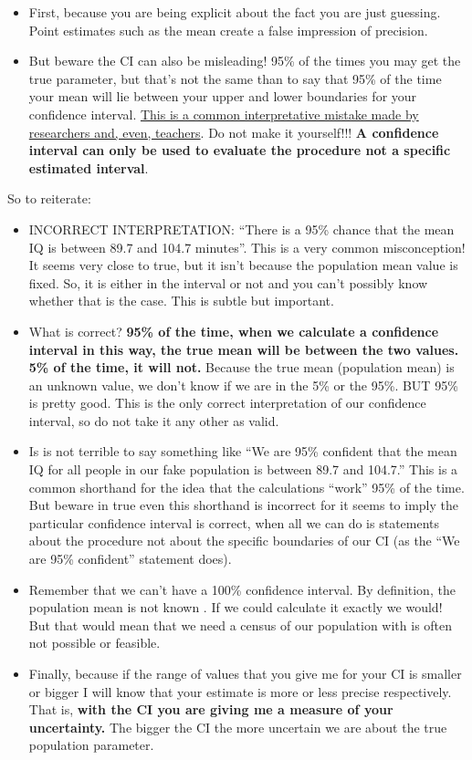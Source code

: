 \documentclass[
]{book}
\providecommand{\tightlist}{%
  \setlength{\itemsep}{0pt}\setlength{\parskip}{0pt}}
\begin{document}
\begin{itemize}
\tightlist
\item
  First, because you are being explicit about the fact you are just guessing. Point estimates such as the mean create a false impression of precision.\\
\item
  But beware the CI can also be misleading! 95\% of the times you may get the true parameter, but that's not the same than to say that 95\% of the time your mean will lie between your upper and lower boundaries for your confidence interval. \href{http://link.springer.com/article/10.3758\%2Fs13423-013-0572-3}{This is a common interpretative mistake made by researchers and, even, teachers}. Do not make it yourself!!! \textbf{A confidence interval can only be used to evaluate the procedure not a specific estimated interval}.
\end{itemize}

So to reiterate:

\begin{itemize}
\tightlist
\item
  INCORRECT INTERPRETATION: ``There is a 95\% chance that the mean IQ is between 89.7 and 104.7 minutes''. This is a very common misconception! It seems very close to true, but it isn't because the population mean value is fixed. So, it is either in the interval or not and you can't possibly know whether that is the case. This is subtle but important.
\item
  What is correct? \textbf{95\% of the time, when we calculate a confidence interval in this way, the true mean will be between the two values. 5\% of the time, it will not.} Because the true mean (population mean) is an unknown value, we don't know if we are in the 5\% or the 95\%. BUT 95\% is pretty good. This is the only correct interpretation of our confidence interval, so do not take it any other as valid.
\item
  Is is not terrible to say something like ``We are 95\% confident that the mean IQ for all people in our fake population is between 89.7 and 104.7.'' This is a common shorthand for the idea that the calculations ``work'' 95\% of the time. But beware in true even this shorthand is incorrect for it seems to imply the particular confidence interval is correct, when all we can do is statements about the procedure not about the specific boundaries of our CI (as the ``We are 95\% confident'' statement does).
\item
  Remember that we can't have a 100\% confidence interval. By definition, the population mean is not known . If we could calculate it exactly we would! But that would mean that we need a census of our population with is often not possible or feasible.
\item
  Finally, because if the range of values that you give me for your CI is smaller or bigger I will know that your estimate is more or less precise respectively. That is, \textbf{with the CI you are giving me a measure of your uncertainty.} The bigger the CI the more uncertain we are about the true population parameter.
\end{itemize}
\end{document}
